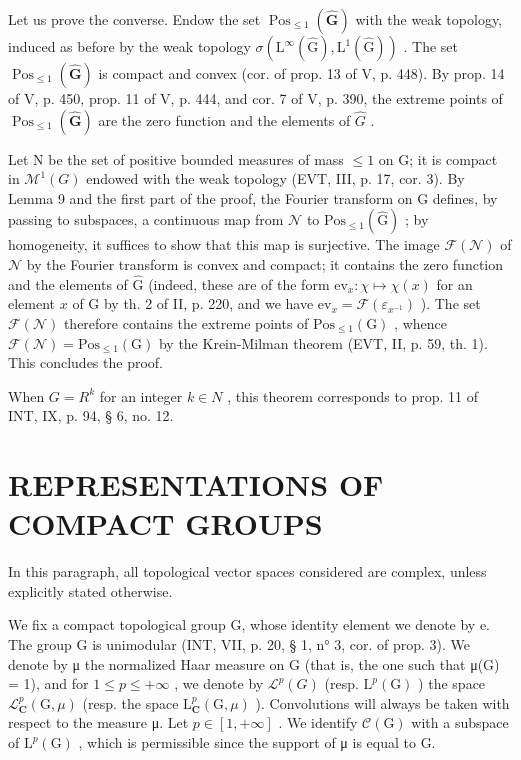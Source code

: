 Let us prove the converse. Endow the set \(\operatorname{Pos}_{\leqslant1}(\widehat{\mathbf{G}})\) with the weak topology, induced as before by the weak topology \(\sigma(\mathrm{L}^{\infty}(\widehat{\mathrm{G}}),\mathrm{L}^{1}(\widehat{\mathrm{G}}))\) . The set \(\operatorname{Pos}_{\leqslant1}(\widehat{\mathbf{G}})\) is compact and convex (cor. of prop. 13 of V, p. 448). By prop. 14 of V, p. 450, prop. 11 of V, p. 444, and cor. 7 of V, p. 390, the extreme points of \(\operatorname{Pos}_{\leqslant1}(\widehat{\mathbf{G}})\) are the zero function and the elements of \(\widehat{G}\) .

Let N be the set of positive bounded measures of mass \(\leqslant 1\) on G; it is compact in \(\mathcal{M}^{1}(G)\) endowed with the weak topology (EVT, III, p. 17, cor. 3). By Lemma 9 and the first part of the proof, the Fourier transform on G defines, by passing to subspaces, a continuous map from \(\mathcal{N}\) to \(\mathrm{Pos}_{\leqslant 1}(\widehat{\mathrm{G}})\) ; by homogeneity, it suffices to show that this map is surjective. The image \(\mathcal{F}(\mathcal{N})\) of \(\mathcal{N}\) by the Fourier transform is convex and compact; it contains the zero function and the elements of \(\widehat{\mathrm{G}}\) (indeed, these are of the form \(\mathrm{ev}_x\colon \chi \mapsto \chi (x)\) for an element \(x\) of G by th. 2 of II, p. 220, and we have \(\mathrm{ev}_x = \mathcal{F}(\varepsilon_{x^{-1}})\) ). The set \(\mathcal{F}(\mathcal{N})\) therefore contains the extreme points of \(\mathrm{Pos}_{\leqslant 1}(\mathrm{G})\) , whence \(\mathcal{F}(\mathcal{N}) = \mathrm{Pos}_{\leqslant 1}(\mathrm{G})\) by the Krein-Milman theorem (EVT, II, p. 59, th. 1). This concludes the proof.

When \(G = R^{k}\) for an integer \(k \in N\) , this theorem corresponds to prop. 11 of INT, IX, p. 94, § 6, no. 12.

\section{REPRESENTATIONS OF COMPACT GROUPS}

In this paragraph, all topological vector spaces considered are complex, unless explicitly stated otherwise.

We fix a compact topological group G, whose identity element we denote by e. The group G is unimodular (INT, VII, p. 20, § 1, n° 3, cor. of prop. 3). We denote by μ the normalized Haar measure on G (that is, the one such that μ(G) = 1), and for \(1 \leqslant p \leqslant +\infty\) , we denote by \(\mathcal{L}^{p}(G)\) (resp. \(\mathrm{L}^{p}(\mathrm{G})\) ) the space \(\mathcal{L}_{\mathbf{C}}^{p}(\mathrm{G}, \mu)\) (resp. the space \(\mathrm{L}_{\mathbf{C}}^{p}(\mathrm{G}, \mu)\) ). Convolutions will always be taken with respect to the measure μ. Let \(p \in [1, +\infty]\) . We identify \(\mathcal{C}(\mathrm{G})\) with a subspace of \(\mathrm{L}^{p}(\mathrm{G})\) , which is permissible since the support of μ is equal to G.

